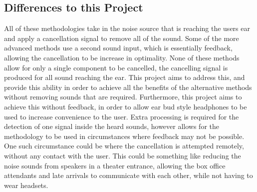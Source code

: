 \subsection{Differences to this Project}
All of these methodologies take in the noise source that is reaching the users ear and apply a cancellation signal to remove all of the sound.
Some of the more advanced methods use a second sound input, which is essentially feedback, allowing the cancellation to be increase in optimality.
None of these methods allow for only a single component to be cancelled, the cancelling signal is produced for all sound reaching the ear.
This project aims to address this, and provide this ability in order to achieve all the benefits of the alternative methods without removing sounds that are required.
Furthermore, this project aims to achieve this without feedback, in order to allow ear bud style headphones to be used to increase convenience to the user.
Extra processing is required for the detection of one signal inside the heard sounds, however allows for the methodology to be used in circumstances where feedback may not be possible.
One such circumstance could be where the cancellation is attempted remotely, without any contact with the user.
This could be something like reducing the noise sounds from speakers in a theater entrance, allowing the box office attendants and late arrivals to communicate with each other, while not having to wear headsets.

